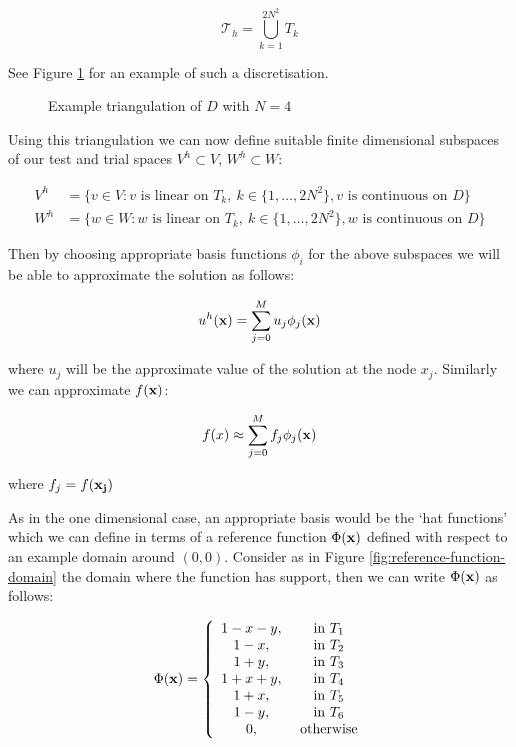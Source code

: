\[
    \mathcal{T}_h = \bigcup_{k=1}^{2N^2} T_k
\]

See Figure \ref{fig:two-d-discretisation} for an example of such a
discretisation.

\begin{figure}
\centering

\caption{Example triangulation of $D$ with $N = 4$}
\label{fig:two-d-discretisation}
\end{figure}

Using this triangulation we can now define suitable finite dimensional subspaces
of our test and trial spaces $V^h \subset V$, $W^h \subset W$:

\begin{align*}
    V^h &= \{v \in V: v \text{ is linear on } T_k,\ k \in \{1,\ldots,2N^2\},
                     v \text{ is continuous on } D\} \\
    W^h &= \{w \in W: w \text{ is linear on } T_k,\ k \in \{1,\ldots,2N^2\},
                     w \text{ is continuous on } D\}
\end{align*}

Then by choosing appropriate basis functions $\phi_i$ for the above subspaces
we will be able to approximate the solution as follows:

\begin{equation}
    u^h(\mathbf{x}) = \sum_{j=0}^Mu_j\phi_j(\mathbf{x})
\end{equation}

where $u_j$ will be the approximate value of the solution at the node $x_j$.
Similarly we can approximate $f(\mathbf{x})$:

\begin{equation}
    f(x) \approx \sum_{j=0}^Mf_j\phi_j(\mathbf{x})
\end{equation}

where $f_j = f(\mathbf{x_j})$

As in the one dimensional case, an appropriate basis would be the `hat
functions' which we can define in terms of a reference function $\Phi(\mathbf{x})$
defined with respect to an example domain around $(0,0)$.  Consider as in
Figure \ref{fig:reference-function-domain} the domain where the function has
support, then we can write $\Phi(\mathbf{x})$ as follows:

\begin{equation}\label{eq:two-d-ref-basis-fn}
    \Phi(\mathbf{x}) = \left\{\begin{array}{c c}
                    1 - x - y, & \text{ in } T_1 \\
                    1 - x,       & \text{ in } T_2 \\
                    1 + y,       & \text{ in } T_3 \\
                    1 + x + y,   & \text{ in } T_4 \\
                    1 + x,       & \text{ in } T_5 \\
                    1 - y,       & \text{ in } T_6 \\
                    0,           & \text{ otherwise}
                  \end{array}\right.
\end{equation}


